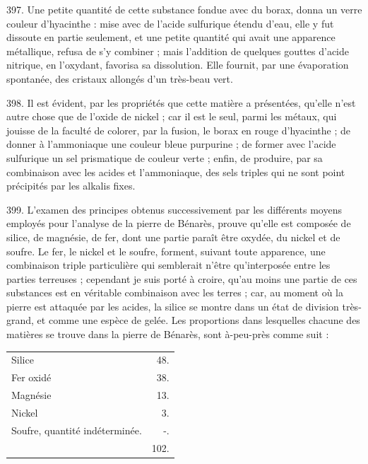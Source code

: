 \documentclass[a4paper, 11pt, oneside, polutonikogreek, french]{article}
\begin{document}
397. Une petite quantité de cette substance fondue avec du borax, donna un verre couleur d'hyacinthe : mise avec de l'acide sulfurique étendu d'eau, elle y fut dissoute en partie seulement, et une petite quantité qui avait une apparence métallique, refusa de s'y combiner ; mais l'addition de quelques gouttes d'acide nitrique, en l'oxydant, favorisa sa dissolution. Elle fournit, par une évaporation spontanée, des cristaux allongés d'un très-beau vert.

398. Il est évident, par les propriétés que cette matière a présentées, qu'elle n'est autre chose que de l'oxide de nickel ; car il est le seul, parmi les métaux, qui jouisse de la faculté de colorer, par la fusion, le borax en rouge d'hyacinthe ; de donner à l'ammoniaque une couleur bleue purpurine ; de former avec l'acide sulfurique un sel prismatique de couleur verte ; enfin, de produire, par sa combinaison avec les acides et l'ammoniaque, des sels triples qui ne sont point précipités par les alkalis fixes.

399. L'examen des principes obtenus successivement par les différents moyens employés pour l'analyse de la pierre de Bénarès, prouve qu'elle est composée de silice, de magnésie, de fer, dont une partie paraît être oxydée, du nickel et de soufre. Le fer, le nickel et le soufre, forment, suivant toute apparence, une combinaison triple particulière qui semblerait n'être qu'interposée entre les parties terreuses ; cependant je suis porté à croire, qu'au moins une partie de ces substances est en véritable combinaison avec les terres ; car, au moment où la pierre est attaquée par les acides, la silice se montre dans un état de division très-grand, et comme une espèce de gelée. Les proportions dans lesquelles chacune des matières se trouve dans la pierre de Bénarès, sont à-peu-près comme suit :

\begin{table}[!ht]
    \centering
    \bfseries
    \Fontauri
    \Large
    \begin{tabular}{l r}
        Silice & 48. \\
        Fer oxidé & 38. \\
        Magnésie & 13. \\
        Nickel & 3. \\
        Soufre, quantité indéterminée. & -. \\ \hline
        ~ & 102. \\
    \end{tabular}
\end{table}
\end{document}
